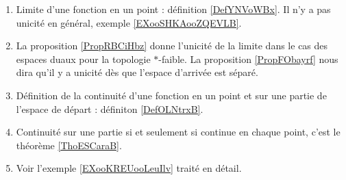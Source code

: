     \label{THEMEooGVCCooHBrNNd}

\begin{enumerate}
    \item
        Limite d'une fonction en un point : définition \ref{DefYNVoWBx}. Il n'y a pas unicité en général, exemple \ref{EXooSHKAooZQEVLB}.
    \item
        La proposition \ref{PropRBCiHbz} donne l'unicité de la limite dans le cas des espaces duaux pour la topologie \( *\)-faible. La proposition \ref{PropFObayrf} nous dira qu'il y a unicité dès que l'espace d'arrivée est séparé.
    \item
        Définition de la continuité d'une fonction en un point et sur une partie de l'espace de départ : définiton \ref{DefOLNtrxB}.
    \item
        Continuité sur une partie si et seulement si continue en chaque point, c'est le théorème \ref{ThoESCaraB}.
    \item
        Voir l'exemple \ref{EXooKREUooLeuIlv} traité en détail.
\end{enumerate}

